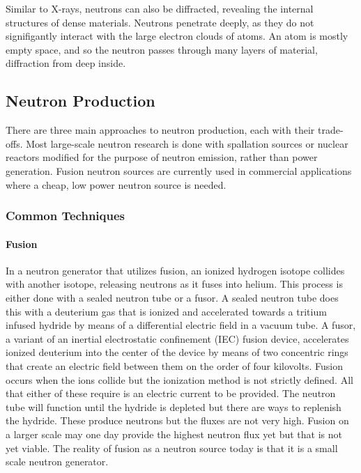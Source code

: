 Similar to X-rays, neutrons can also be diffracted, revealing the internal structures of dense materials. Neutrons penetrate deeply, as they do not signifigantly interact with the large electron clouds of atoms. An atom is mostly empty space, and so the neutron passes through many layers of material, diffraction from deep inside.

\subsection{Neutron Production}

There are three main approaches to neutron production, each with their trade-offs. Most large-scale neutron research is done with spallation sources or nuclear reactors modified for the purpose of neutron emission, rather than power generation. Fusion neutron sources are currently used in commercial applications where a cheap, low power neutron source is needed.

\subsubsection{Common Techniques}

\paragraph{Fusion}

In a neutron generator that utilizes fusion, an ionized hydrogen isotope collides with another isotope, releasing neutrons as it fuses into helium. This process is either done with a sealed neutron tube or a fusor. A sealed neutron tube does this with a deuterium gas that is ionized and accelerated towards a tritium infused hydride by means of a differential electric field in a vacuum tube. A fusor, a variant of an inertial electrostatic confinement (IEC) fusion device, accelerates ionized deuterium into the center of the device by means of two concentric rings that create an electric field between them on the order of four kilovolts. Fusion occurs when the ions collide but the ionization method is not strictly defined. All that either of these require is an electric current to be provided. The neutron tube will function until the hydride is depleted but there are ways to replenish the hydride. These produce neutrons but the fluxes are not very high. Fusion on a larger scale may one day provide the highest neutron flux yet but that is not yet viable. The reality of fusion as a neutron source today is that it is a small scale neutron generator.

